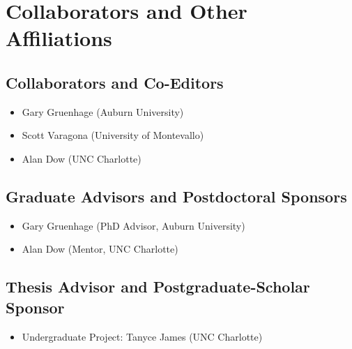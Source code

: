 \documentclass[11pt,letterpaper]{article}
\begin{document}

\section{Collaborators and Other Affiliations}

\subsection{Collaborators and Co-Editors}
\begin{itemize}
  \item Gary Gruenhage (Auburn University)
  \item Scott Varagona (University of Montevallo)
  \item Alan Dow (UNC Charlotte)
\end{itemize}
\subsection{Graduate Advisors and Postdoctoral Sponsors}
\begin{itemize}
  \item Gary Gruenhage (PhD Advisor, Auburn University)
  \item Alan Dow (Mentor, UNC Charlotte)
\end{itemize}
\subsection{Thesis Advisor and Postgraduate-Scholar Sponsor}
\begin{itemize}
  \item Undergraduate Project: Tanyce James (UNC Charlotte)
\end{itemize}
\end{document}
